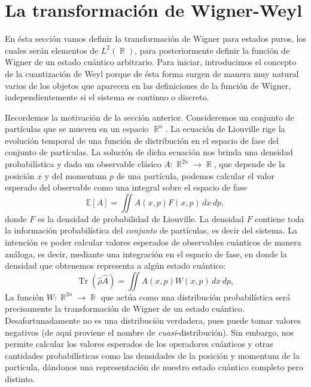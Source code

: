 \documentclass[a4paper,11pt]{report}
\DeclareMathOperator{\R}{\mathbb{R}}
\DeclareMathOperator{\Tr}{Tr}
\begin{document}

  \section{La transformación de Wigner-Weyl}

  En ésta sección vamos definir la transformación de Wigner
  para estados puros, los cuales serán elementos de
  $L^2(\R)$, para posteriormente definir la función de
  Wigner de un estado cuántico arbitrario. Para iniciar,
  introducimos el concepto de la cuantización de Weyl porque
  de ésta forma surgen de manera muy natural varios de los
  objetos que aparecen en las definiciones de la función de
  Wigner, independientemente si el sistema es continuo o
  discreto.

  Recordemos la motivación de la sección anterior.
  Consideremos un conjunto de partículas que se mueven en un
  espacio $\R^{n}$. La ecuación de Liouville rige la
  evolución temporal de una función de distribución en el
  espacio de fase del conjunto de partículas. La solución de
  dicha ecuación nos brinda una densidad probabilística y
  dado un observable clásico $A : \R^{2n} \to \R$, que
  depende de la posición $x$ y del momentum $p$ de una
  partícula, podemos calcular el valor esperado del
  observable como una integral sobre el espacio de fase
  \begin{equation}
    \mathbb E[A]
    = \iint A(x,p) F(x,p) \, dx \, dp,
  \end{equation}
  donde $F$ es la densidad de probabilidad de Liouville. La
  densidad $F$ contiene toda la información probabilística
  del \textit{conjunto} de partículas, es decir del sistema.
  La intención es poder calcular valores esperados de
  observables cuánticos de manera análoga, es decir,
  mediante una integración en el espacio de fase, en donde
  la densidad que obtenemos representa a algún estado
  cuántico:
  \begin{equation}
    \Tr\left(\hat{\rho} \hat{A}\right)
    = \iint A(x,p)W(x,p) \, dx \, dp,
  \end{equation}
  La función $W : \R^{2n} \to \R$ que actúa como una
  distribución probabilística será precisamente la
  transformación de Wigner de un estado cuántico.
  Desafortunadamente no es una distribución verdadera, pues
  puede tomar valores negativos (de aquí proviene el nombre
  de \textit{cuasi}-distribución). Sin embargo, nos permite
  calcular los valores esperados de los operadores cuánticos
  y otras cantidades probabilísticas como las densidades de
  la posición y momentum de la partícula, dándonos una
  representación de nuestro estado cuántico completo pero
  distinto.
\end{document}
